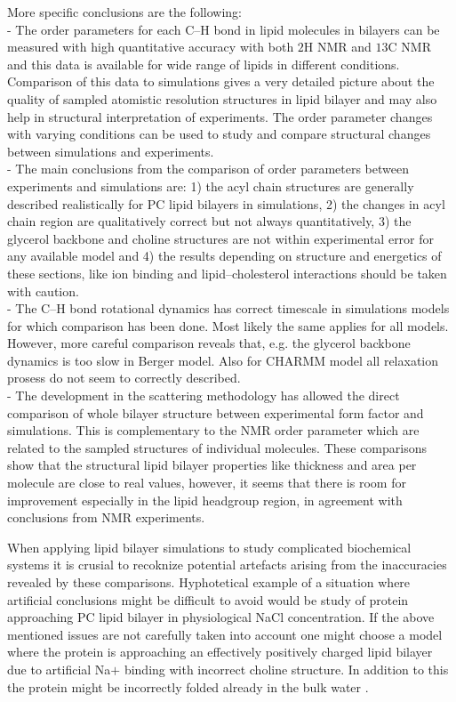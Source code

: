 \documentclass[aps,prl,superscriptaddress,twocolumn]{revtex4}
\begin{document}
More specific conclusions are the following: \\
- The order parameters for each C--H bond in lipid molecules in bilayers can be measured
with high quantitative accuracy with both $ 2$H NMR and $ 13$C NMR and this data
is available for wide range of lipids in different conditions. Comparison of this data to simulations
gives a very detailed picture about the quality of sampled atomistic resolution structures
in lipid bilayer and may also help in structural interpretation of experiments. 
The order parameter changes with varying conditions can be used to study and compare structural changes
between simulations and experiments.\\
- The main conclusions from the comparison of order parameters between experiments and simulations are:
1) the acyl chain structures are generally described realistically for PC lipid bilayers in simulations, 
2) the changes in acyl chain region are qualitatively correct but not always quantitatively,
3) the glycerol backbone and choline structures are not within experimental error for any available model and
4) the results depending on structure and energetics of these sections, like ion binding and lipid--cholesterol interactions
should be taken with caution. \\
- The C--H bond rotational dynamics has correct timescale in simulations models for which comparison has been done.
Most likely the same applies for all models. However, more careful comparison reveals that, e.g. the
glycerol backbone dynamics is too slow in Berger model. Also for CHARMM model all relaxation prosess
do not seem to correctly described. \\
- The development in the scattering methodology has allowed the direct comparison of whole bilayer 
structure between experimental form factor and simulations. This is complementary to the NMR order parameter
which are related to the sampled structures of individual molecules. These comparisons show that the
structural lipid bilayer properties like thickness and area per molecule are close to real values, however,
it seems that there is room for improvement especially in the lipid headgroup region, in agreement with conclusions
from NMR experiments.  

When applying lipid bilayer simulations to study complicated biochemical systems it is crusial to recoknize 
potential artefacts arising from the inaccuracies revealed by these comparisons. Hyphotetical example of
a situation where artificial conclusions might be difficult to avoid would be study of protein approaching
PC lipid bilayer in physiological NaCl concentration. If the above mentioned issues are not carefully taken
into account one might choose a model where the protein is approaching an effectively positively charged 
lipid bilayer due to artificial Na$ +$ binding with incorrect choline structure. In addition to
this the protein might be incorrectly folded already in the bulk water \cite{??}.
\end{document}
